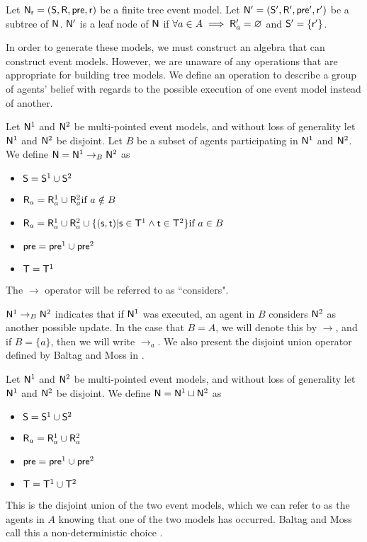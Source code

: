 \begin{defn} \label{leaf}
Let $\mathrm{\mathsf{N}}_\mathrm{\mathsf{r}} = (\mathrm{\mathsf{S}}, \mathrm{\mathsf{R}}, \mathrm{\mathsf{pre}}, \mathrm{\mathsf{r}})$ be a finite tree event model.
Let $\mathrm{\mathsf{N}}' = (\mathrm{\mathsf{S}}', \mathrm{\mathsf{R}}', \mathrm{\mathsf{pre}}', \mathrm{\mathsf{r}}')$ be a subtree of $\mathrm{\mathsf{N}}$.
$\mathrm{\mathsf{N}}'$ is a leaf node of $\mathrm{\mathsf{N}}$ if $\forall a \in A \implies \mathrm{\mathsf{R}}'_a = \varnothing$ and $\mathrm{\mathsf{S}}' = \{
\mathrm{\mathsf{r}}'\}$.
\end{defn}

In order to generate these models, we must construct an algebra that can construct event models.
However, we are unaware of any operations that are appropriate for building tree models.
We define an operation to describe a group of agents' belief with regards to the possible execution
of one event model instead of another.

\begin{defn} \label{considers}
Let $\mathrm{\mathsf{N}}^1$ and $\mathrm{\mathsf{N}}^2$ be multi-pointed event models, and without loss of
generality let $\mathrm{\mathsf{N}}^1$ and $\mathrm{\mathsf{N}}^2$ be disjoint.
Let $B$ be a subset of agents participating in $\mathrm{\mathsf{N}}^1$ and $\mathrm{\mathsf{N}}^2$.
We define $\mathrm{\mathsf{N}} = \mathrm{\mathsf{N}}^1 \to_B \mathrm{\mathsf{N}}^2$ as 
\begin{itemize}
  \item $\mathrm{\mathsf{S}} = \mathrm{\mathsf{S}}^1 \cup \mathrm{\mathsf{S}}^2$
  \item $\mathrm{\mathsf{R}}_a = \mathrm{\mathsf{R}}^1_a \cup \mathrm{\mathsf{R}}^2_a \text{if } a \notin B$
	\item $\mathrm{\mathsf{R}}_a =
      \mathrm{\mathsf{R}}^1_a \cup
      \mathrm{\mathsf{R}}^2_a \cup
      \{(\mathrm{\mathsf{s}},\mathrm{\mathsf{t}}) | \mathrm{\mathsf{s}} \in \mathrm{\mathsf{T}}^1 \land \mathrm{\mathsf{t}} \in \mathrm{\mathsf{T}}^2 \}
    \text{if } a \in B $
  \item $\mathrm{\mathsf{pre}} = \mathrm{\mathsf{pre}}^1 \cup \mathrm{\mathsf{pre}}^2$
  \item $\mathrm{\mathsf{T}} = \mathrm{\mathsf{T}}^1$
\end{itemize}
The $\to$ operator will be referred to as ``considers".
\end{defn}

$\mathrm{\mathsf{N}}^1 \to_B \mathrm{\mathsf{N}}^2$ indicates that if $\mathrm{\mathsf{N}}^1$ was executed, an agent in $B$ considers $\mathrm{\mathsf{N}}^2$ as another
possible update.
In the case that $B = A$, we will denote this by $\to$, and if $B = \{a\}$, then
we will write $\to_a$.
We also present the disjoint union operator defined by Baltag and Moss in \cite{baltag2005programs}.

\begin{defn} \label{disjoint}
Let $\mathrm{\mathsf{N}}^1$ and $\mathrm{\mathsf{N}}^2$ be multi-pointed event models, and without loss of generality let $\mathrm{\mathsf{N}}^1$ and
$\mathrm{\mathsf{N}}^2$ be disjoint.
We define $\mathrm{\mathsf{N}} = \mathrm{\mathsf{N}}^1 \sqcup \mathrm{\mathsf{N}}^2$ as
\begin{itemize}
	\item $\mathrm{\mathsf{S}} = \mathrm{\mathsf{S}}^1 \cup \mathrm{\mathsf{S}}^2$
	\item $\mathrm{\mathsf{R}}_a = \mathrm{\mathsf{R}}^1_a \cup \mathrm{\mathsf{R}}^2_a$
	\item $\mathrm{\mathsf{pre}} = \mathrm{\mathsf{pre}}^1 \cup \mathrm{\mathsf{pre}}^2$
	\item $\mathrm{\mathsf{T}} = \mathrm{\mathsf{T}}^1 \cup \mathrm{\mathsf{T}}^2$
\end{itemize}
\end{defn}
This is the disjoint union of the two event models, which we can refer to as the agents in $A$
knowing that one of the two models has occurred.
Baltag and Moss call this a non-deterministic choice \cite{baltag2005programs}.

